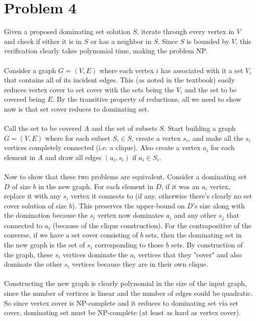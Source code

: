 \documentclass[11pt]{article}
\begin{document}
\begin{enumerate}[(a)]
\end{enumerate}


\newpage
\section*{Problem 4}
Given a proposed dominating set solution $S$, iterate through every vertex in $V$ and check if either it is in $S$ or has a neighbor in $S$. Since $S$ is bounded by $V$, this verification clearly takes polynomial time, making the problem NP. \\\\
Consider a graph $G=(V,E)$ where each vertex $i$ has associated with it a set $V_i$ that contains all of its incident edges. This (as noted in the textbook) easily reduces vertex cover to set cover with the sets being the $V_i$ and the set to be covered being $E$. By the transitive property of reductions, all we need to show now is that set cover reduces to dominating set. \\\\
Call the set to be covered $A$ and the set of subsets $S$. Start building a graph $G=(V,E)$ where for each subset $S_i \in S$, create a vertex $s_i$, and make all the $s_i$ vertices completely connected (i.e. a clique). Also create a  vertex $a_i$ for each element in $A$ and draw all edges $(a_i,s_i)$ if $a_i \in S_i$. \\\\
Now to show that these two problems are equivalent. Consider a dominating set $D$ of size $b$ in the new graph. For each element in $D$, if it was an $a_i$ vertex, replace it with any $s_i$ vertex it connects to (if any, otherwise there's clearly no set cover solution of size $b$). This preserves the upper-bound on $D$'s size along with the domination because the $s_i$ vertex now dominates $a_i$ and any other $s_j$ that connected to $a_i$ (because of the clique construction).  For the contrapositive of the converse, if we have a set cover consisting of $b$ sets, then the dominating set in the new graph is the set of $s_i$ corresponding to those $b$ sets. By construction of the graph, these $s_i$ vertices dominate the $a_i$ vertices that they "cover" and also dominate the other $s_i$ vertices because they are in their own clique. \\\\
Constructing the new graph is clearly polynomial in the size of the input graph, since the number of vertices is linear and the number of edges could be quadratic. So since vertex cover is NP-complete and it reduces to dominating set via set cover, dominating set must be NP-complete (at least as hard as vertex cover).
\end{document}
